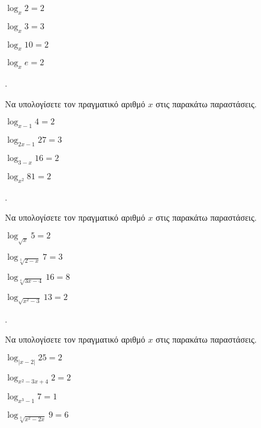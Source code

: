 \documentclass[11pt,a4paper,twocolumn]{article}
\newcounter{askhsh}
\newcommand{\askhsh}{{\large\theaskhsh.}\ \addtocounter{askhsh}{1}}
\begin{document}
\begin{multicols}{2}
\begin{alist}
\item $ \log_{x}{2}=2 $
\item $ \log_{x}{3}=3 $
\item $ \log_{x}{10}=2 $
\item $ \log_{x}{e}=2 $
\end{alist}
\end{multicols}
\askhsh Να υπολογίσετε τον πραγματικό αριθμό $ x $ στις παρακάτω παραστάσεις.
\begin{multicols}{2}
\begin{alist}
\item $ \log_{x-1}{4}=2 $
\item $ \log_{2x-1}{27}=3 $
\item $ \log_{3-x}{16}=2 $
\item $ \log_{x^2}{81}=2 $
\end{alist}
\end{multicols}
\askhsh Να υπολογίσετε τον πραγματικό αριθμό $ x $ στις παρακάτω παραστάσεις.
\begin{multicols}{2}
\begin{alist}
\item $ \log_{\sqrt{x}}{5}=2 $
\item $ \log_{\sqrt[3]{2-x}}{7}=3 $
\item $ \log_{\sqrt[4]{3x-4}}{16}=8 $
\item $ \log_{\sqrt{x^2-3}}{13}=2 $
\end{alist}
\end{multicols}
\askhsh Να υπολογίσετε τον πραγματικό αριθμό $ x $ στις παρακάτω παραστάσεις.
\begin{multicols}{2}
\begin{alist}
\item $ \log_{|x-2|}{25}=2 $
\item $ \log_{x^2-3x+4}{2}=2 $
\item $ \log_{x^3-1}{7}=1 $
\item $ \log_{\sqrt[3]{x^2-2x}}{9}=6 $
\end{alist}
\end{multicols}
\end{document}
